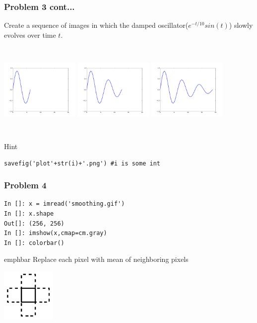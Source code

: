 \documentclass[14pt,compress]{beamer}
\newcommand{\emphbar}[1]
{\begin{beamercolorbox}[rounded=true]{emphbar} 
      {#1}
 \end{beamercolorbox}
}
\newcounter{time}
\begin{document}
\begin{frame}[fragile]
  \frametitle{Problem 3 cont...}
Create a sequence of images in which the damped
oscillator($e^{-t/10}sin(t)$) slowly evolves over time $t$.
\begin{columns}
\includegraphics[width=1.5in,height=1.5in, interpolate=true]{data/plot2}
\includegraphics[width=1.5in,height=1.5in, interpolate=true]{data/plot4}
\includegraphics[width=1.5in,height=1.5in, interpolate=true]{data/plot6}
\end{columns}
\begin{block}{Hint}
\small
  \begin{lstlisting}
savefig('plot'+str(i)+'.png') #i is some int 
  \end{lstlisting}  
\end{block}
\end{frame}

\begin{frame}[fragile]
  \frametitle{Problem 4}
  \begin{lstlisting}
In []: x = imread('smoothing.gif')
In []: x.shape
Out[]: (256, 256)
In []: imshow(x,cmap=cm.gray)
In []: colorbar()
\end{lstlisting}
\emphbar{Replace each pixel with mean of neighboring pixels}
  \begin{center}
  \includegraphics[height=1in, interpolate=true]{data/neighbour}
  \end{center}
\end{frame}
\end{document}
